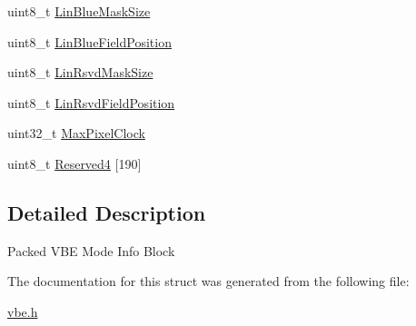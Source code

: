 \begin{DoxyCompactItemize}
\item 
uint8\+\_\+t \hyperlink{group__vbe_gad8a25cec803bf91fb40a20a0aa5d5bf7}{Lin\+Blue\+Mask\+Size}
\item 
uint8\+\_\+t \hyperlink{group__vbe_ga3f38d6becbe961786cd7ab58ec37fc07}{Lin\+Blue\+Field\+Position}
\item 
uint8\+\_\+t \hyperlink{group__vbe_ga334886fc9a915ff91966c3aac1da586a}{Lin\+Rsvd\+Mask\+Size}
\item 
uint8\+\_\+t \hyperlink{group__vbe_ga3df070e698b5f54814e20c8813f7bf7e}{Lin\+Rsvd\+Field\+Position}
\item 
uint32\+\_\+t \hyperlink{group__vbe_gab1fbd72846963ebb34a308a7edf7bbe1}{Max\+Pixel\+Clock}
\item 
uint8\+\_\+t \hyperlink{group__vbe_ga2e13c4795a00241b919aa3aab86560ce}{Reserved4} \mbox{[}190\mbox{]}
\end{DoxyCompactItemize}


\subsection{Detailed Description}
Packed V\+BE Mode Info Block 

The documentation for this struct was generated from the following file\+:\begin{DoxyCompactItemize}
\item 
\hyperlink{vbe_8h}{vbe.\+h}\end{DoxyCompactItemize}
